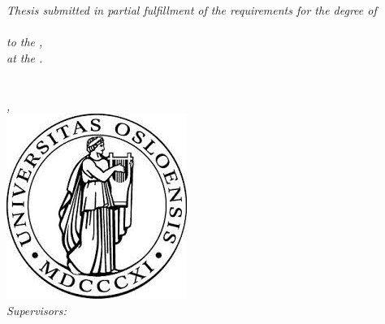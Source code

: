 
\begin{titlepage}
\begin{center}


{\huge \bfseries \ttitle\par}\vspace{1cm} %


\Large \textit{Thesis submitted in partial fulfillment of the requirements for the degree of\\}
\textit{\textbf{\degreename}}\\ %
\textit{to the \facname,}\\
\textit{at the \univname.}\\[1cm]

\LARGE \textbf{\authorname}\\
\Large \textit{\groupname\\\deptname, \univname}\\[1cm] %

\includegraphics[scale=0.5]{Pictures/uioLogo.jpg}\\[1cm]

\Large \textit{Supervisors:}\\
\href{http://folk.uio.no/cristi/master_topics_prisacariu.php}{\supname} \\ %
\href{http://www.lix.polytechnique.fr/Labo/Ulrich.Fahrenberg/}{\csupname} \\ %
\href{http://heim.ifi.uio.no/~msteffen/}{\ccsupname} \\ %
\href{http://olaf.at.ifi.uio.no/}{\cccsupname} %



\end{center}
\end{titlepage}
